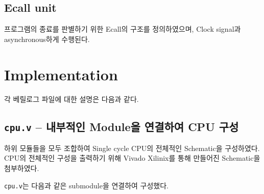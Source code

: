 \documentclass{scrartcl}
\begin{document}
\subsection{Ecall unit}
프로그램의 종료를 판별하기 위한 Ecall의 구조를 정의하였으며, Clock signal과 asynchronous하게 수행된다.

\section{Implementation}

각 베릴로그 파일에 대한 설명은 다음과 같다.

\subsection{\texttt{cpu.v} -- 내부적인 Module을 연결하여 CPU 구성}
하위 모듈들을 모두 조합하여 Single cycle CPU의 전체적인 Schematic을 구성하였다. CPU의 전체적인 구성을 출력하기 위해
Vivado Xilinix를 통해 만들어진 Schematic을 첨부하였다.



\texttt{cpu.v}는 다음과 같은 submodule을 연결하여 구성했다.
\end{document}
